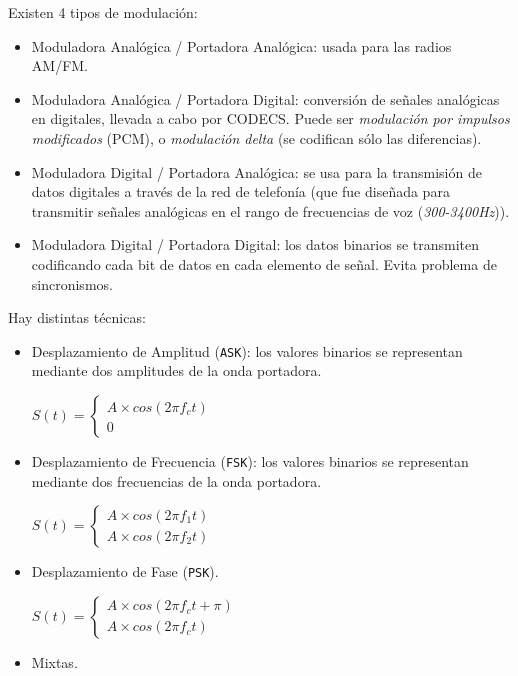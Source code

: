 \documentclass[]{article}
\begin{document}
Existen 4 tipos de modulación:
\begin{itemize}
    \item Moduladora Analógica / Portadora Analógica: usada para las radios AM/FM.
    \item Moduladora Analógica / Portadora Digital: conversión de señales analógicas en digitales, llevada a cabo por CODECS. Puede ser \emph{modulación por impulsos modificados} (PCM), o \emph{modulación delta} (se codifican sólo las diferencias).
    \item Moduladora Digital / Portadora Analógica: se usa para la transmisión de datos digitales a través de la red de telefonía (que fue diseñada para transmitir señales analógicas en el rango de frecuencias de voz (\emph{300-3400Hz})).
    \item Moduladora Digital / Portadora Digital: los datos binarios se transmiten codificando cada bit de datos en cada elemento de señal. Evita problema de sincronismos.
\end{itemize}


Hay distintas técnicas:
\begin{itemize}
    \item Desplazamiento de Amplitud (\texttt{ASK}): los valores binarios se representan mediante dos amplitudes de la onda portadora.
    \begin{center}
        $S(t) = \begin{cases}
                    A\times cos(2\pi f_c t)\\
                    0
                \end{cases}$
    \end{center}


    \item Desplazamiento de Frecuencia (\texttt{FSK}): los valores binarios se representan mediante dos frecuencias de la onda portadora.
     \begin{center}
        $S(t) = \begin{cases}
                    A\times cos(2\pi f_1 t)\\
                    A\times cos(2\pi f_2 t)
                \end{cases}$
    \end{center}

    \item Desplazamiento de Fase (\texttt{PSK}).
    \begin{center}
        $S(t) = \begin{cases}
                    A\times cos(2\pi f_c t + \pi)\\
                    A\times cos(2\pi f_c t)
                \end{cases}$
    \end{center}
    \item Mixtas.
\end{itemize}
\end{document}
